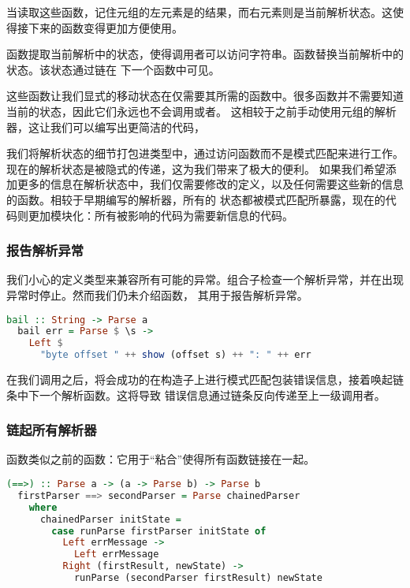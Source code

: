 \documentclass[./main.tex]{subfiles}
\begin{document}
当读取这些函数，记住元组的左元素是的结果，而右元素则是当前解析状态。这使得接下来的函数变得更加方便使用。

函数提取当前解析中的状态，使得调用者可以访问字符串。函数替换当前解析中的状态。该状态通过\acode{==>}链在
下一个函数中可见。

这些函数让我们显式的移动状态在仅需要其所需的函数中。很多函数并不需要知道当前的状态，因此它们永远也不会调用或者。
这相较于之前手动使用元组的解析器，这让我们可以编写出更简洁的代码，

我们将解析状态的细节打包进类型中，通过访问函数而不是模式匹配来进行工作。现在的解析状态是被隐式的传递，这为我们带来了极大的便利。
如果我们希望添加更多的信息在解析状态中，我们仅需要修改的定义，以及任何需要这些新的信息的函数。相较于早期编写的解析器，所有的
状态都被模式匹配所暴露，现在的代码则更加模块化：所有被影响的代码为需要新信息的代码。

\subsubsection*{报告解析异常}

我们小心的定义类型来兼容所有可能的异常。\acode{==>}组合子检查一个解析异常，并在出现异常时停止。然而我们仍未介绍函数，
其用于报告解析异常。

\begin{lstlisting}[language=Haskell]
  bail :: String -> Parse a
  bail err = Parse $ \s ->
    Left $
      "byte offset " ++ show (offset s) ++ ": " ++ err
\end{lstlisting}

在我们调用之后，\acode{(==>)}将会成功的在构造子上进行模式匹配包装错误信息，接着唤起链条中下一个解析函数。这将导致
错误信息通过链条反向传递至上一级调用者。

\subsubsection*{链起所有解析器}

\acode{(==>)}函数类似之前的函数：它用于“粘合”使得所有函数链接在一起。

\begin{lstlisting}[language=Haskell]
  (==>) :: Parse a -> (a -> Parse b) -> Parse b
  firstParser ==> secondParser = Parse chainedParser
    where
      chainedParser initState =
        case runParse firstParser initState of
          Left errMessage ->
            Left errMessage
          Right (firstResult, newState) ->
            runParse (secondParser firstResult) newState
\end{lstlisting}
\end{document}
